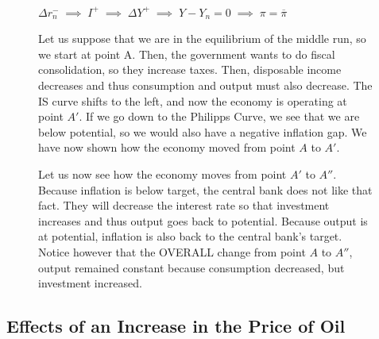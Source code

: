 \documentclass{extarticle}
\begin{document}
\begin{figure}[H]
\begin{minipage}{0.65\linewidth}
\begin{center}
 \\
$\Delta r_n^- \;\implies\; I^+ \;\implies\; \Delta Y^+ \;\implies\; Y - Y_n = 0 \;\implies\; \pi = \overline{\pi}$ 
\end{center}

Let us suppose that we are in the equilibrium of the middle run, so we start at point A. Then, the government wants to do fiscal consolidation, so they increase taxes. Then, disposable income decreases and thus consumption and output must also decrease. The IS curve shifts to the left, and now the economy is operating at point $A'$. If we go down to the Philipps Curve, we see that we are below potential, so we would also have a negative inflation gap. We have now shown how the economy moved from point $A$ to $A'$.
\vspace{2mm}

Let us now see how the economy moves from point $A'$ to $A''$. Because inflation is below target, the central bank does not like that fact. They will decrease the interest rate so that investment increases and thus output goes back to potential. Because output is at potential, inflation is also back to the central bank's target. 
Notice however that the OVERALL change from point $A$ to $A''$, output remained constant because consumption decreased, but investment increased.
  \end{minipage} 
\end{figure}

\subsection{Effects of an Increase in the Price of Oil}
\end{document}
